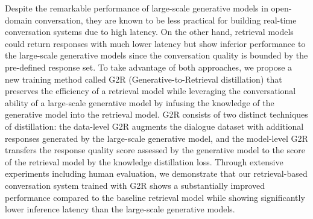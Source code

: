 Despite the remarkable performance of large-scale generative models in open-domain conversation, they are known to be less practical for building real-time conversation systems due to high latency. On the other hand, retrieval models could return responses with much lower latency but show inferior performance to the large-scale generative models since the conversation quality is bounded by the pre-defined response set. To take advantage of both approaches, we propose a new training method called G2R (Generative-to-Retrieval distillation) that preserves the efficiency of a retrieval model while leveraging the conversational ability of a large-scale generative model by infusing the knowledge of the generative model into the retrieval model. G2R consists of two distinct techniques of distillation: the data-level G2R augments the dialogue dataset with additional responses generated by the large-scale generative model, and the model-level G2R transfers the response quality score assessed by the generative model to the score of the retrieval model by the knowledge distillation loss. Through extensive experiments including human evaluation, we demonstrate that our retrieval-based conversation system trained with G2R shows a substantially improved performance compared to the baseline retrieval model while showing significantly lower inference latency than the large-scale generative models.
